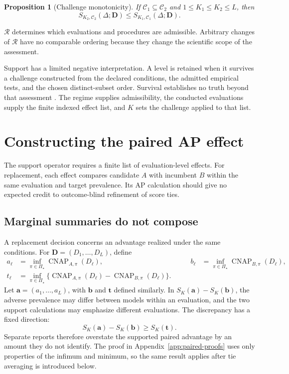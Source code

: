 \documentclass[11pt]{article}
\newcommand{\CNAP}{\operatorname{CNAP}}
\newcommand{\Regime}{\mathcal{R}}
\newcommand{\PSet}{\Pi_\star}
\newtheorem{proposition}{Proposition}
\theoremstyle{remark}
\begin{document}
\begin{proposition}[Challenge monotonicity]
\label{prop:monotonicity}
If $\mathcal C_1\subseteq\mathcal C_2$ and
$1\leq K_1\leq K_2\leq L$, then
\[
S_{K_2,\mathcal C_2}(\Delta;\mathbf D)
\leq
S_{K_1,\mathcal C_1}(\Delta;\mathbf D).
\]
\end{proposition}

$\Regime$ determines which evaluations and procedures are admissible. Arbitrary changes of $\Regime$ have no comparable ordering because they change the scientific scope of the assessment.

Support has a limited negative interpretation. A level is retained when it
survives a challenge constructed from the declared conditions, the admitted
empirical tests, and the chosen distinct-subset order. Survival establishes no
truth beyond that assessment \cite{popper1959logic,popper1963conjectures}. The
regime supplies admissibility, the conducted evaluations supply the finite
indexed effect list, and $K$ sets the challenge applied to that list.

\section{Constructing the paired AP effect}
\label{sec:paired}

The support operator requires a finite list of evaluation-level effects. For replacement, each effect compares candidate $A$ with incumbent $B$ within the same evaluation and target prevalence. Its AP calculation should give no expected credit to outcome-blind refinement of score ties.

\subsection{Marginal summaries do not compose}

A replacement decision concerns an advantage realized under the same conditions. For $\mathbf D=(D_1,\ldots,D_L)$, define
\[
\begin{aligned}
a_\ell
&=
\inf_{\pi\in\PSet}\CNAP_{A,\pi}(D_\ell),
&\qquad
b_\ell
&=
\inf_{\pi\in\PSet}\CNAP_{B,\pi}(D_\ell),
\\
t_\ell
&=
\inf_{\pi\in\PSet}
\{\CNAP_{A,\pi}(D_\ell)-\CNAP_{B,\pi}(D_\ell)\}.
\end{aligned}
\]
Let $\mathbf a=(a_1,\ldots,a_L)$, with $\mathbf b$ and $\mathbf t$ defined similarly. In $S_K(\mathbf a)-S_K(\mathbf b)$, the adverse prevalence may differ between models within an evaluation, and the two support calculations may emphasize different evaluations. The discrepancy has a fixed direction:
\begin{equation}
S_K(\mathbf a)
-
S_K(\mathbf b)
\geq
S_K(\mathbf t).
\label{eq:noncomposition}
\end{equation}
Separate reports therefore overstate the supported paired advantage by an amount they do not identify. The proof in Appendix~\ref{app:paired-proofs} uses only properties of the infimum and minimum, so the same result applies after tie averaging is introduced below.
\end{document}
